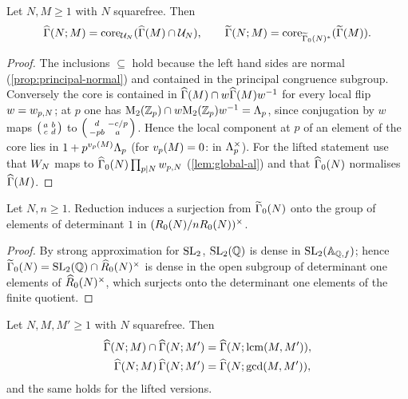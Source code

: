 \begin{proposition}\label{prop:principal-core}
Let $N, M \geq 1$ with $N$ squarefree. Then
\[
  \GammaPrincipal[ad]{N}{M} = \Core{\MaxCompact{N}}{\GammaFull[ad]{M}\cap\MaxCompact{N}},
  \qquad
  \GammaPrincipal[lift]{N}{M} = \Core{\GammaZeroStar[lift]{N}}{\GammaFull[lift]{M}}.
\]
\end{proposition}

\begin{proof}
The inclusions $\subseteq$ hold because the left hand sides are normal
(\cref{prop:principal-normal}) and contained in the principal congruence
subgroup. Conversely the core is contained in
$\GammaFull[ad]{M} \cap w\GammaFull[ad]{M}w^{-1}$ for every local flip
$w = w_{p,N}$; at $p$ one has
$\mathrm{M}_{2}(\mathbb{Z}_{p}) \cap w\mathrm{M}_{2}(\mathbb{Z}_{p})w^{-1} =
\Lambda_{p}$, since conjugation by $w$ maps
$\left(\begin{smallmatrix} a & b \\ c & d \end{smallmatrix}\right)$ to $\left(\begin{smallmatrix} d & -c/p \\ -pb & a \end{smallmatrix}\right)$. Hence the local
component at $p$ of an element of the core lies in
$1 + p^{v_{p}(M)}\Lambda_{p}$ (for $v_{p}(M) = 0$: in
$\Lambda_{p}^{\times}$). For the lifted statement use that
$W_{N}$ maps to $\GammaZero[ad]{N}\prod_{p\mid N}\ALflip{p,N}$
(\cref{lem:global-al}) and that $\GammaZero[ad]{N}$ normalises
$\GammaFull[ad]{M}$.
\end{proof}

\begin{lemma}
\label{lem:strong-approx-eichler}
Let $N, n \geq 1$. Reduction induces a surjection from
$\GammaZero[lift]{N}$ onto the group of elements of determinant $1$ in
$(R_{0}(N)/nR_{0}(N))^{\times}$.
\end{lemma}

\begin{proof}
By strong approximation for $\SL{2}{}$, $\SL{2}{\QQ}$ is dense in
$\SL{2}{\FiniteAdeles{\QQ}}$; hence $\GammaZero[lift]{N} = \SL{2}{\QQ} \cap
\unit{\AdelicEichlerOrder{N}}$ is dense in the open subgroup of determinant
one elements of $\widehat{R}_{0}(N)^{\times}$, which surjects onto the
determinant one elements of the finite quotient.
\end{proof}

\begin{proposition}\label{prop:lcm-gcd}
Let $N, M, M' \geq 1$ with $N$ squarefree. Then
\begin{align*}
  \GammaPrincipal[ad]{N}{M} \cap \GammaPrincipal[ad]{N}{M'} &=
  \GammaPrincipal[ad]{N}{\mathrm{lcm}(M,M')},\\
  \GammaPrincipal[ad]{N}{M}\,\GammaPrincipal[ad]{N}{M'} &=
  \GammaPrincipal[ad]{N}{\gcd(M,M')},
\end{align*}
and the same holds for the lifted versions.
\end{proposition}

